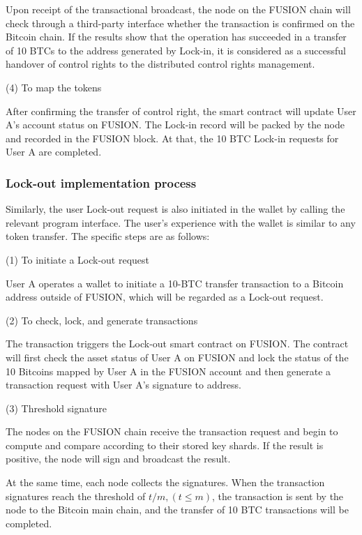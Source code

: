 \documentclass[a4paper,12pt]{article}
\begin{document}
Upon receipt of the transactional broadcast, the node on the FUSION chain will check through a third-party interface whether the transaction is confirmed on the Bitcoin chain. If the results show that the operation has succeeded in a transfer of 10 BTCs to the address generated by Lock-in, it is considered as a successful handover of control rights to the distributed control rights management.

(4) To map the tokens

After confirming the transfer of control right, the smart contract will update User A's account status on FUSION. The Lock-in record will be packed by the node and recorded in the FUSION block. At that, the 10 BTC Lock-in requests for User A are completed.

\subsubsection{Lock-out implementation process}

Similarly, the user Lock-out request is also initiated in the wallet by calling the relevant program interface. The user's experience with the wallet is similar to any token transfer. The specific steps are as follows:

(1) To initiate a Lock-out request 

User A operates a wallet to initiate a 10-BTC transfer transaction to a Bitcoin address outside of FUSION, which will be regarded as a Lock-out request.

(2) To check, lock, and generate transactions

The transaction triggers the Lock-out smart contract on FUSION. The contract will first check the asset status of User A on FUSION and lock the status of the 10 Bitcoins mapped by User A in the FUSION account and then generate a transaction request with User A's signature to address.

(3) Threshold signature

The nodes on the FUSION chain receive the transaction request and begin to compute and compare according to their stored key shards. If the result is positive, the node will sign and broadcast the result.

At the same time, each node collects the signatures. When the transaction signatures reach the threshold of $t/m, \left (t \le m \right)$, the transaction is sent by the node to the Bitcoin main chain, and the transfer of 10 BTC transactions will be completed.
\end{document}
